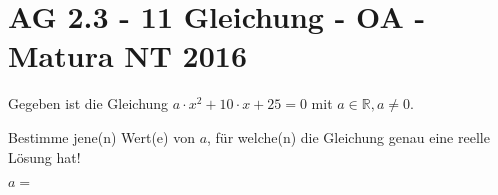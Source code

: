 \section{AG 2.3 - 11 Gleichung - OA - Matura NT 2016}

\begin{beispiel}[AG 2.3]{1} %
Gegeben ist die Gleichung $a\cdot x^2+10\cdot x+25=0$ mit $a\in\mathbb{R},a\neq 0$.

Bestimme jene(n) Wert(e) von $a$, für welche(n) die Gleichung genau eine reelle Lösung hat!

$a=$ 
\end{beispiel}